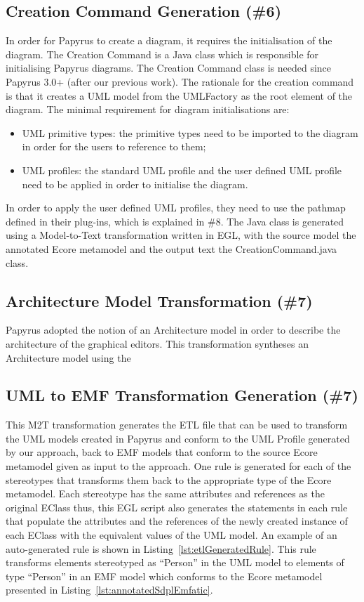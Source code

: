 \subsection{Creation Command Generation (\#6)}
\label{sec:creationCommand}
In order for Papyrus to create a diagram, it requires the initialisation of the diagram.
The Creation Command is a Java class which is responsible for initialising Papyrus diagrams. 
The Creation Command class is needed since Papyrus 3.0+ (after our previous work).
The rationale for the creation command is that it creates a UML model from the UMLFactory as the root element of the diagram.
The minimal requirement for diagram initialisations are:
\begin{itemize}
	\item UML primitive types: the primitive types need to be imported to the diagram in order for the users to reference to them;
	\item UML profiles: the standard UML profile and the user defined UML profile need to be applied in order to initialise the diagram.
\end{itemize}

In order to apply the user defined UML profiles, they need to use the pathmap defined in their plug-ins, which is explained in \#8.
The Java class is generated using a Model-to-Text transformation written in EGL, with the source model the annotated Ecore metamodel and the output text the CreationCommand.java class.

\subsection{Architecture Model Transformation (\#7)}
\label{sec:architectureModel}
Papyrus adopted the notion of an Architecture model in order to describe the architecture of the graphical editors.
This transformation syntheses an Architecture model using the 

\subsection{UML to EMF Transformation Generation (\#7)}
\label{sec:uml2emf}
This M2T transformation generates the ETL file that can be used to transform the UML models created in Papyrus and conform to the UML Profile generated by 
our approach, back to EMF models that conform to the source Ecore metamodel given as input to the approach. 
One rule is generated for each of the stereotypes that transforms them back to the appropriate type of the Ecore metamodel. 
Each stereotype has the same attributes and references as the original EClass thus, this EGL script also generates the statements in each rule that populate the attributes and the references of the newly created instance of each EClass with the equivalent values of the UML model. 
An example of an auto-generated rule is shown in Listing~\ref{lst:etlGeneratedRule}. 
This rule transforms elements stereotyped as ``Person'' in the UML model to elements of type ``Person'' in an EMF model which conforms to the Ecore metamodel presented in Listing~\ref{lst:annotatedSdplEmfatic}.

